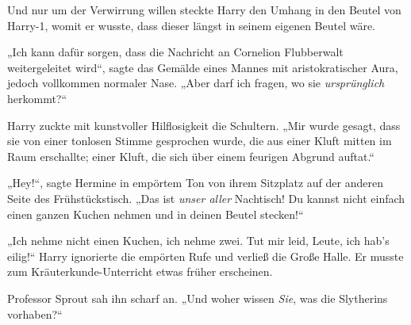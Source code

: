Und nur um der Verwirrung willen steckte Harry den Umhang in den Beutel von Harry-1, womit er wusste, dass dieser längst in seinem eigenen Beutel wäre.

\later

„Ich kann dafür sorgen, dass die Nachricht an Cornelion Flubberwalt weitergeleitet wird“, sagte das Gemälde eines Mannes mit aristokratischer Aura, jedoch vollkommen normaler Nase. „Aber darf ich fragen, wo sie \emph{ursprünglich} herkommt?“

Harry zuckte mit kunstvoller Hilflosigkeit die Schultern. „Mir wurde gesagt, dass sie von einer tonlosen Stimme gesprochen wurde, die aus einer Kluft mitten im Raum erschallte; einer Kluft, die sich über einem feurigen Abgrund auftat.“

\later

„Hey!“, sagte Hermine in empörtem Ton von ihrem Sitzplatz auf der anderen Seite des Frühstückstisch. „Das ist \emph{unser aller} Nachtisch! Du kannst nicht einfach einen ganzen Kuchen nehmen und in deinen Beutel stecken!“

„Ich nehme nicht einen Kuchen, ich nehme zwei. Tut mir leid, Leute, ich hab's eilig!“ Harry ignorierte die empörten Rufe und verließ die Große Halle. Er musste zum Kräuterkunde-Unterricht etwas früher erscheinen.

\later

Professor Sprout sah ihn scharf an. „Und woher wissen \emph{Sie}, was die Slytherins vorhaben?“


